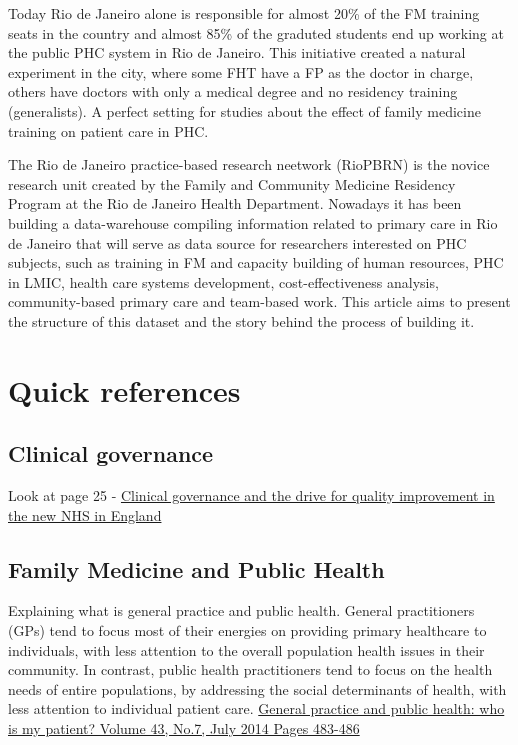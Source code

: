 \documentclass[]{book}
\begin{document}
Today Rio de Janeiro alone is responsible for almost 20\% of the FM training seats in the country and almost 85\% of the graduted students end up working at the public PHC system in Rio de Janeiro. This initiative created a natural experiment in the city, where some FHT have a FP as the doctor in charge, others have doctors with only a medical degree and no residency training (generalists). A perfect setting for studies about the effect of family medicine training on patient care in PHC.

The Rio de Janeiro practice-based research neetwork (RioPBRN) is the novice research unit created by the Family and Community Medicine Residency Program at the Rio de Janeiro Health Department. Nowadays it has been building a data-warehouse compiling information related to primary care in Rio de Janeiro that will serve as data source for researchers interested on PHC subjects, such as training in FM and capacity building of human resources, PHC in LMIC, health care systems development, cost-effectiveness analysis, community-based primary care and team-based work. This article aims to present the structure of this dataset and the story behind the process of building it.

\hypertarget{quick-references}{%
\chapter*{Quick references}\label{quick-references}}

\hypertarget{clinical-governance}{%
\section*{Clinical governance}\label{clinical-governance}}

Look at page 25 -
\href{https://www.ncbi.nlm.nih.gov/pmc/articles/PMC1113460/pdf/61.pdf}{Clinical governance and the drive for quality improvement in the new NHS in England}

\hypertarget{family-medicine-and-public-health}{%
\section*{Family Medicine and Public Health}\label{family-medicine-and-public-health}}

Explaining what is general practice and public health. General practitioners (GPs) tend to focus most of their energies on providing primary healthcare to individuals, with less attention to the overall population health issues in their community. In contrast, public health practitioners tend to focus on the health needs of entire populations, by addressing the social determinants of health, with less attention to individual patient care.
\href{https://www.racgp.org.au/afp/2014/july/who-is-my-patient/}{General practice and public health: who is my patient? Volume 43, No.7, July 2014 Pages 483-486}
\end{document}
